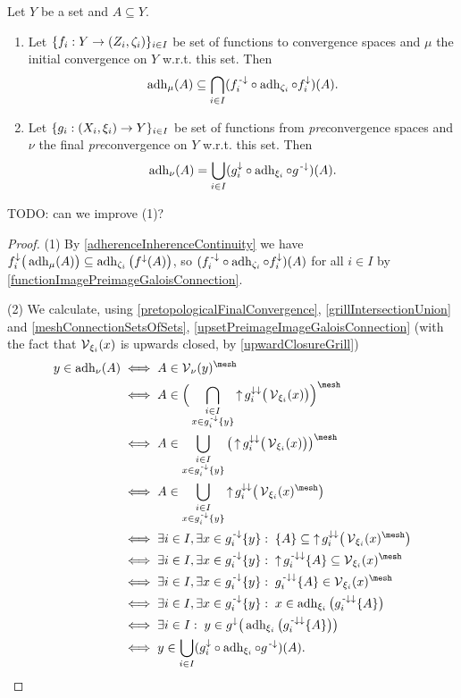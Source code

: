 \begin{proposition} \label{adherenceInitialFinalConvergence}
Let $Y$ be a set and $A\subseteq Y$.
\begin{enumerate}
\item Let $\{f_i: Y\to \sSet{Z_i, \zeta_i}\}_{i\in I}$ be set of functions to convergence spaces and $\mu$ the initial convergence on $Y$ w.r.t. this set. Then
\[ \operatorname{adh}_\mu(A) \subseteq \bigcap_{i\in I}(f^{{\text{\hspace{0.15em}-}\downarrow}}_i\circ \operatorname{adh}_{\zeta_i}\circ f^{\downarrow}_i)(A). \]
\item Let $\{g_i: \sSet{X_i, \xi_i} \to Y\}_{i\in I}$ be set of functions from \emph{pre}convergence spaces and $\nu$ the final \emph{pre}convergence on $Y$ w.r.t. this set. Then
\[ \operatorname{adh}_\nu(A) = \bigcup_{i\in I}(g_i^{\downarrow}\circ\operatorname{adh}_{\xi_i}\circ g^{{\text{\hspace{0.15em}-}\downarrow}})(A). \]
\end{enumerate}
\end{proposition}
TODO: can we improve (1)?
\begin{proof}
(1) By \ref{adherenceInherenceContinuity} we have $f_i^{\downarrow}\big(\operatorname{adh}_\mu(A)\big) \subseteq \operatorname{adh}_{\zeta_i}\big(f^{\downarrow}(A)\big)$, so $(f^{{\text{\hspace{0.15em}-}\downarrow}}_i\circ \operatorname{adh}_{\zeta_i}\circ f^{\downarrow}_i)(A)$ for all $i\in I$ by \ref{functionImagePreimageGaloisConnection}.

(2) We calculate, using \ref{pretopologicalFinalConvergence}, \ref{grillIntersectionUnion} and \ref{meshConnectionSetsOfSets}, \ref{upsetPreimageImageGaloisConnection} (with the fact that $\operatorname{\mathcal{V}}_{\xi_i}(x)$ is upwards closed, by \ref{upwardClosureGrill})
\begin{align*}
y\in \adh_\nu(A) &\iff A\in \vicinities_\nu(y)^\mesh \\
&\iff A\in \Big(\bigcap_{\substack{i\in I \\ x\in g^\preimf_i\{y\}}}\upset g_i^{\imf\imf}\big(\vicinities_{\xi_i}(x)\big)\Big)^\mesh \\
&\iff A\in \bigcup_{\substack{i\in I \\ x\in g^\preimf_i\{y\}}}\big(\upset g_i^{\imf\imf}\big(\vicinities_{\xi_i}(x)\big)\big)^\mesh \\
&\iff A\in \bigcup_{\substack{i\in I \\ x\in g^\preimf_i\{y\}}}\upset g_i^{\imf\imf}\big(\vicinities_{\xi_i}(x)^\mesh\big) \\
&\iff \exists i\in I, \exists x\in g^\preimf_i\{y\}: \;  \{A\}\subseteq \upset g_i^{\imf\imf}\big(\vicinities_{\xi_i}(x)^\mesh\big) \\
&\iff \exists i\in I, \exists x\in g^\preimf_i\{y\}: \;  \upset g_i^{\preimf\imf}\{A\}\subseteq \vicinities_{\xi_i}(x)^\mesh \\
&\iff \exists i\in I, \exists x\in g^\preimf_i\{y\}: \;  g_i^{\preimf\imf}\{A\}\in \vicinities_{\xi_i}(x)^\mesh \\
&\iff \exists i\in I, \exists x\in g^\preimf_i\{y\}: \;  x\in \adh_{\xi_i}\big(g_i^{\preimf\imf}\{A\}\big) \\
&\iff \exists i\in I: \;  y\in g^{\imf}\big(\adh_{\xi_i}\big(g_i^{\preimf\imf}\{A\}\big)\big) \\
&\iff y\in \bigcup_{i\in I}(g_i^{\imf}\circ\adh_{\xi_i}\circ g^{\preimf})(A).
\end{align*}
\end{proof}




